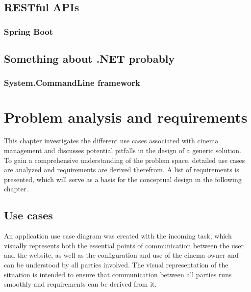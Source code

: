 \section{RESTful APIs}

\subsection{Spring Boot}

\section{Something about .NET probably}

\subsection{System.CommandLine framework}

\chapter{Problem analysis and requirements}
\label{ch:problem-analysis}

This chapter investigates the different use cases associated with cinema management and discusses potential pitfalls in the design of a generic solution. To gain a comprehensive understanding of the problem space, detailed use cases are analyzed and requirements are derived therefrom. A list of requirements is presented, which will serve as a basis for the conceptual design in the following chapter.

\section{Use cases}\label{sec:use-cases}


An application use case diagram was created with the incoming task, which visually represents both the essential points of communication between the user and the website, as well as the configuration and use of the cinema owner and can be understood by all parties involved. The visual representation of the situation is intended to ensure that communication between all parties runs smoothly and requirements can be derived from it.

